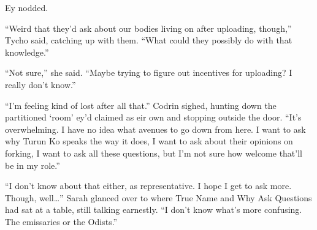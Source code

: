 Ey nodded.

``Weird that they'd ask about our bodies living on after uploading, though,'' Tycho said, catching up with them. ``What could they possibly do with that knowledge.''

``Not sure,'' she said. ``Maybe trying to figure out incentives for uploading? I really don't know.''

``I'm feeling kind of lost after all that.'' Codrin sighed, hunting down the partitioned `room' ey'd claimed as eir own and stopping outside the door. ``It's overwhelming. I have no idea what avenues to go down from here. I want to ask why Turun Ko speaks the way it does, I want to ask about their opinions on forking, I want to ask all these questions, but I'm not sure how welcome that'll be in my role.''

``I don't know about that either, as representative. I hope I get to ask more. Though, well\ldots{}'' Sarah glanced over to where True Name and Why Ask Questions had sat at a table, still talking earnestly. ``I don't know what's more confusing. The emissaries or the Odists.''
